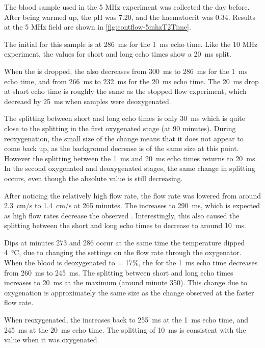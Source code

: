 The blood sample used in the 5 MHz experiment was collected the day before.
After being warmed up, the pH was 7.20, and the haematocrit was 0.34.
Results at the 5 MHz field are shown in \autoref{fig:contflow-5mhzT2Time}.

The initial \Ttwo for this sample is at \SI{286}{ms} for the \SI{1}{ms} echo time.
Like the 10 MHz experiment, the \Ttwo values for  short and long echo times show a \SI{20}{ms} split.

When the \SOtwo is dropped, the \Ttwo also decreases from \SI{300}{ms} to \SI{286}{ms} for the \SI{1}{ms} echo time, and from \SI{266}{ms} to \SI{232}{ms} for the \SI{20}{ms} echo time.
The \SI{20}{ms} drop at short echo time is roughly the same as the stopped flow experiment, which decreaed by \SI{25}{ms} when samples were deoxygenated.

The splitting between short and long echo times is only \SI{30}{ms} which is quite close to the splitting in the first oxygenated stage (at 90 minutes).
During reoxygenation, the small size of the \Ttwo change means that it does not appear to come back up, as the background \Ttwo decrease is of the same size at this point.
However the splitting between the \SI{1}{ms} and \SI{20}{ms} echo times returns to \SI{20}{ms}.
In the second oxygenated and deoxygenated stages, the same change in splitting occurs, even though the absolute \Ttwo value is still decreasing.

After noticing the relatively high flow rate, the flow rate was lowered from around \SI{2.3}{cm/s} to \SI{1.4}{cm/s} at 265 minutes.
The \Ttwo increases to \SI{290}{ms}, which is expected as high flow rates decrease the observed \Ttwo.
Interestingly, this also caused the splitting between the short and long echo times to decrease to around \SI{10}{ms}.

Dips at minutes 273 and 286 occur at the same time the temperature dipped \SI{4}{\celsius}, due to changing the settings on the flow rate through the oxygenator.
When the blood is deoxygenated to \SOtwo = 17\%,  the \Ttwo for the \SI{1}{ms} echo time decreases from \SI{260}{ms} to \SI{245}{ms}.
The splitting between short and long echo times increases to \SI{20}{ms} at the maximum (around minute 350).
This \Ttwo change due to oxygenation is approximately the same size as the change observed at the faster flow rate.

When reoxygenated, the \Ttwo increases back to \SI{255}{ms} at the \SI{1}{ms} echo time, and \SI{245}{ms} at the \SI{20}{ms} echo time.
The splitting of \SI{10}{ms} is consistent with the value when it was oxygenated.

